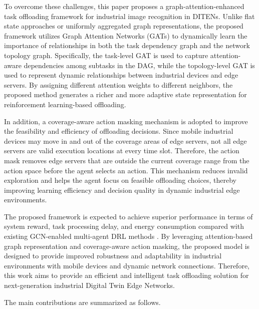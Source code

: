\documentclass[conference]{IEEEtran}
\begin{document}
To overcome these challenges, this paper proposes a graph-attention-enhanced task offloading framework for industrial image recognition in DITENs. Unlike flat state approaches or uniformly aggregated graph representations, the proposed framework utilizes Graph Attention Networks (GATs) to dynamically learn the importance of relationships in both the task dependency graph and the network topology graph. Specifically, the task-level GAT is used to capture attention-aware dependencies among subtasks in the DAG, while the topology-level GAT is used to represent dynamic relationships between industrial devices and edge servers. By assigning different attention weights to different neighbors, the proposed method generates a richer and more adaptive state representation for reinforcement learning-based offloading.

In addition, a coverage-aware action masking mechanism is adopted to improve the feasibility and efficiency of offloading decisions. Since mobile industrial devices may move in and out of the coverage areas of edge servers, not all edge servers are valid execution locations at every time slot. Therefore, the action mask removes edge servers that are outside the current coverage range from the action space before the agent selects an action. This mechanism reduces invalid exploration and helps the agent focus on feasible offloading choices, thereby improving learning efficiency and decision quality in dynamic industrial edge environments.

The proposed framework is expected to achieve superior performance in terms of system reward, task processing delay, and energy consumption compared with existing GCN-enabled multi-agent DRL methods \cite{10892268}. By leveraging attention-based graph representation and coverage-aware action masking, the proposed model is designed to provide improved robustness and adaptability in industrial environments with mobile devices and dynamic network connections. Therefore, this work aims to provide an efficient and intelligent task offloading solution for next-generation industrial Digital Twin Edge Networks.

The main contributions are summarized as follows.
\end{document}
